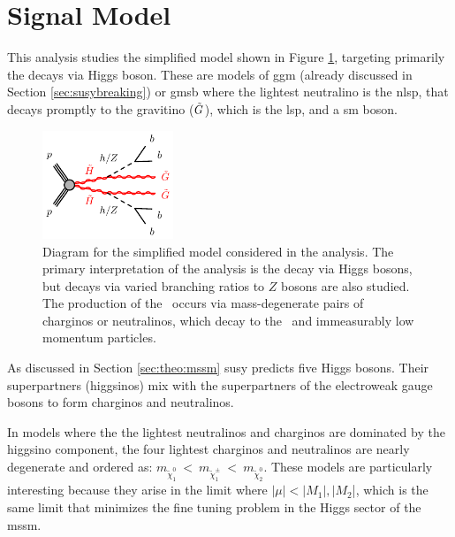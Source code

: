 
\section{Signal Model}

This analysis studies the simplified model shown in Figure \ref{fig:feyn}, targeting primarily the decays via Higgs boson.
These are models of \gls{ggm} \cite{Meade:2008wd,Cheung:2007es,Dine:1981gu,AlvarezGaume:1981wy,Nappi:1982hm} 
(already discussed in Section \ref{sec:susybreaking})
or \gls{gmsb} \cite{Dimopoulos:1996vz,Matchev:1999ft} where 
the lightest neutralino is the \gls{nlsp}, that decays promptly to the gravitino ($\tilde{G}$), which is the \gls{lsp}, and 
a \gls{sm} boson. 

\begin{figure}[htbp]
	\centering
	\includegraphics[width=0.35\textwidth]{figures/ewk_prod/varie/N1N1-hhGG-bbbb_Z}
	\caption{Diagram for the simplified model considered in the analysis. The primary interpretation of the analysis is the decay via Higgs bosons, but decays via varied branching ratios to $Z$ bosons are also studied. The production of the \hino\ occurs
via mass-degenerate pairs of charginos or neutralinos, which decay to the \ninoone\ and immeasurably low momentum particles.} 
	\label{fig:feyn}
\end{figure}

As discussed in Section \ref{sec:theo:mssm} \gls{susy} predicts five Higgs bosons. 
Their superpartners (higgsinos) mix with the superpartners of the electroweak gauge bosons to form charginos and neutralinos.

In models where the the lightest neutralinos and charginos are dominated by the higgsino component, the four lightest charginos 
and neutralinos are nearly degenerate \cite{Papucci:2011wy,Barbieri:2009ev,Han:2014kaa} and ordered as: $m_{\tilde\chi^0_1}~<~m_{\tilde\chi^\pm_1}~<~m_{\tilde\chi^0_2}$.
These models are particularly interesting because they arise in the limit where $|\mu| < |M_1|, |M_2$|, which is the same limit 
that minimizes the fine tuning problem in the Higgs sector of the \gls{mssm}.

